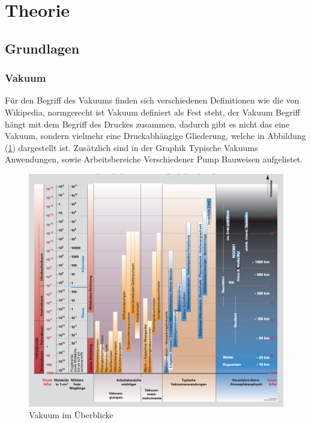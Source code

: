 \section{Theorie}
\label{sec:Theorie}

\subsection{Grundlagen}
\subsubsection*{Vakuum}
Für den Begriff des Vakuums finden sich verschiedenen Definitionen
wie die von Wikipedia, \cite[Vakuum ist in der technischen Praxis ein Raum mit weitgehender Abwesenheit von Materie.]{dewiki}
normgerecht ist Vakuum definiert als 
\cite[der Zustand eines Gases, 
wenn in einem Behälter der Druck des Gases 
und damit die Teilchenzahldichte niedriger ist als außerhalb oder wenn der Druck des Gases niedriger ist als 300 mbar,
d. h. kleiner als der niedrigste auf der Erdoberfläche vorkommende Atmosphärendruck.]{DIN} 
Fest steht, der Vakuum Begriff hängt mit dem Begriff des Druckes zusammen,
dadurch gibt es nicht das eine Vakuum, sondern vielmehr eine Druckabhängige Gliederung,
welche in Abbildung (\ref{fig:Vakuum}) dargestellt ist. 
Zusätzlich sind in der Graphik Typische Vakuums Anwendungen,
sowie Arbeitsbereiche Verschiedener Pump Bauweisen aufgelistet.
\begin{figure}[ht]
    \centering
    \includegraphics[width=\textwidth]{abb/Vakuum.png}
    \caption{Vakuum im Überblicke \cite{Pfeifer}}
    \label{fig:Vakuum}
\end{figure}

